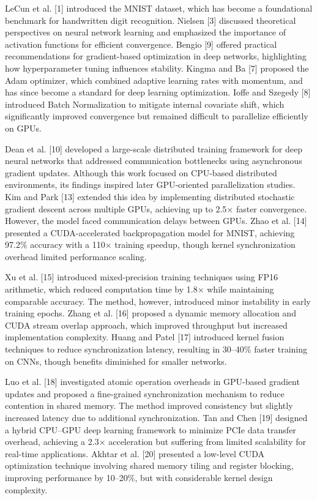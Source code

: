 \documentclass[conference]{IEEEtran}
\begin{document}
LeCun et al. [1] introduced the MNIST dataset, which has become a foundational benchmark for handwritten digit recognition. Nielsen [3] discussed theoretical perspectives on neural network learning and emphasized the importance of activation functions for efficient convergence. Bengio [9] offered practical recommendations for gradient-based optimization in deep networks, highlighting how hyperparameter tuning influences stability. Kingma and Ba [7] proposed the Adam optimizer, which combined adaptive learning rates with momentum, and has since become a standard for deep learning optimization. Ioffe and Szegedy [8] introduced Batch Normalization to mitigate internal covariate shift, which significantly improved convergence but remained difficult to parallelize efficiently on GPUs.

Dean et al. [10] developed a large-scale distributed training framework for deep neural networks that addressed communication bottlenecks using asynchronous gradient updates. Although this work focused on CPU-based distributed environments, its findings inspired later GPU-oriented parallelization studies. Kim and Park [13] extended this idea by implementing distributed stochastic gradient descent across multiple GPUs, achieving up to 2.5× faster convergence. However, the model faced communication delays between GPUs. Zhao et al. [14] presented a CUDA-accelerated backpropagation model for MNIST, achieving 97.2\% accuracy with a 110× training speedup, though kernel synchronization overhead limited performance scaling.

Xu et al. [15] introduced mixed-precision training techniques using FP16 arithmetic, which reduced computation time by 1.8× while maintaining comparable accuracy. The method, however, introduced minor instability in early training epochs. Zhang et al. [16] proposed a dynamic memory allocation and CUDA stream overlap approach, which improved throughput but increased implementation complexity. Huang and Patel [17] introduced kernel fusion techniques to reduce synchronization latency, resulting in 30–40\% faster training on CNNs, though benefits diminished for smaller networks.

Luo et al. [18] investigated atomic operation overheads in GPU-based gradient updates and proposed a fine-grained synchronization mechanism to reduce contention in shared memory. The method improved consistency but slightly increased latency due to additional synchronization. Tan and Chen [19] designed a hybrid CPU–GPU deep learning framework to minimize PCIe data transfer overhead, achieving a 2.3× acceleration but suffering from limited scalability for real-time applications. Akhtar et al. [20] presented a low-level CUDA optimization technique involving shared memory tiling and register blocking, improving performance by 10–20\%, but with considerable kernel design complexity.
\end{document}
